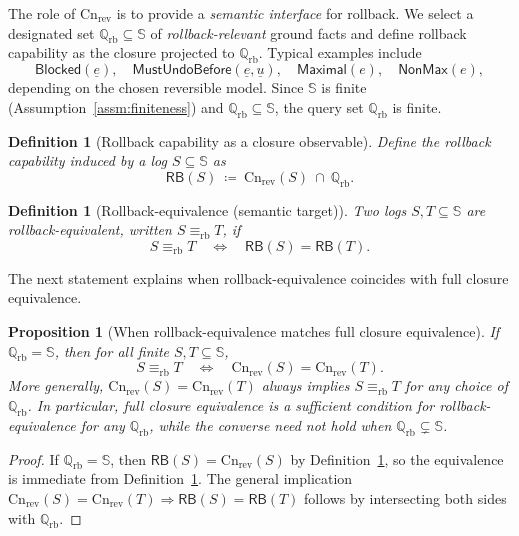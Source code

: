 \documentclass[twoside]{article}
\newtheorem{definition}[theorem]{Definition}
\newtheorem{proposition}[theorem]{Proposition}
\newcommand{\Cn}{\mathrm{Cn}}
\newcommand{\1}{\mathbf{1}}
\begin{document}
The role of \(\Cn_{\mathrm{rev}}\) is to provide a \emph{semantic interface} for rollback.
We select a designated set \(\mathbb{Q}_{\mathrm{rb}}\subseteq \mathbb{S}\) of \emph{rollback-relevant} ground facts
and define rollback capability as the closure projected to \(\mathbb{Q}_{\mathrm{rb}}\).
Typical examples include
\[
\mathsf{Blocked}(\underline{e}),\quad
\mathsf{MustUndoBefore}(\underline{e},\underline{u}),\quad
\mathsf{Maximal}(e),\quad
\mathsf{NonMax}(e),
\]
depending on the chosen reversible model.
Since \(\mathbb{S}\) is finite (Assumption~\ref{assm:finiteness}) and \(\mathbb{Q}_{\mathrm{rb}}\subseteq \mathbb{S}\), the query set \(\mathbb{Q}_{\mathrm{rb}}\) is finite.

\begin{definition}[Rollback capability as a closure observable]
\label{def:rb-capability}
Define the rollback capability induced by a log \(S\subseteq\mathbb{S}\) as
\[
\mathsf{RB}(S)\ \coloneqq\ \Cn_{\mathrm{rev}}(S)\ \cap\ \mathbb{Q}_{\mathrm{rb}}.
\]
\end{definition}

\begin{definition}[Rollback-equivalence (semantic target)]
\label{def:rollback-equiv}
Two logs \(S,T\subseteq \mathbb{S}\) are \emph{rollback-equivalent}, written \(S \equiv_{\mathrm{rb}} T\), if
\[
S \equiv_{\mathrm{rb}} T
\quad\Longleftrightarrow\quad
\mathsf{RB}(S)=\mathsf{RB}(T).
\]
\end{definition}

The next statement explains when rollback-equivalence coincides with full closure equivalence.

\begin{proposition}[When rollback-equivalence matches full closure equivalence]
\label{prop:rb-vs-closure}
If \(\mathbb{Q}_{\mathrm{rb}}=\mathbb{S}\), then for all finite \(S,T\subseteq\mathbb{S}\),
\[
S \equiv_{\mathrm{rb}} T \quad\Longleftrightarrow\quad \Cn_{\mathrm{rev}}(S)=\Cn_{\mathrm{rev}}(T).
\]
More generally, \(\Cn_{\mathrm{rev}}(S)=\Cn_{\mathrm{rev}}(T)\) always implies \(S\equiv_{\mathrm{rb}}T\) for any choice of \(\mathbb{Q}_{\mathrm{rb}}\). 
In particular, full closure equivalence is a sufficient condition for rollback-equivalence for any \(\mathbb{Q}_{\mathrm{rb}}\),
while the converse need not hold when \(\mathbb{Q}_{\mathrm{rb}}\subsetneq \mathbb{S}\).
\end{proposition}

\begin{proof}
If \(\mathbb{Q}_{\mathrm{rb}}=\mathbb{S}\), then \(\mathsf{RB}(S)=\Cn_{\mathrm{rev}}(S)\) by Definition~\ref{def:rb-capability},
so the equivalence is immediate from Definition~\ref{def:rollback-equiv}. The general implication
\(\Cn_{\mathrm{rev}}(S)=\Cn_{\mathrm{rev}}(T)\Rightarrow \mathsf{RB}(S)=\mathsf{RB}(T)\) follows by intersecting both sides with \(\mathbb{Q}_{\mathrm{rb}}\).
\end{proof}
\end{document}
